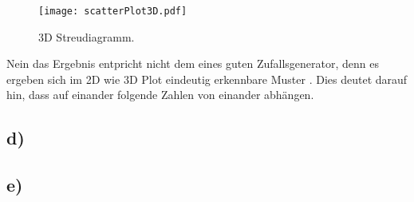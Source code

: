\FloatBarrier
\begin{figure}
  \centering
  \texttt{[image: scatterPlot3D.pdf]}
  \caption{3D Streudiagramm.}
  \label{fig:a2p5}
\end{figure}
\FloatBarrier
Nein das Ergebnis entpricht nicht dem eines guten Zufallsgenerator, denn es ergeben sich im 2D wie 3D Plot eindeutig
erkennbare Muster . Dies deutet darauf hin, dass auf einander folgende Zahlen von einander abhängen.

\subsection{d)}
\label{subsec:a2d}


\subsection{e)}
\label{subsec:a2e}
